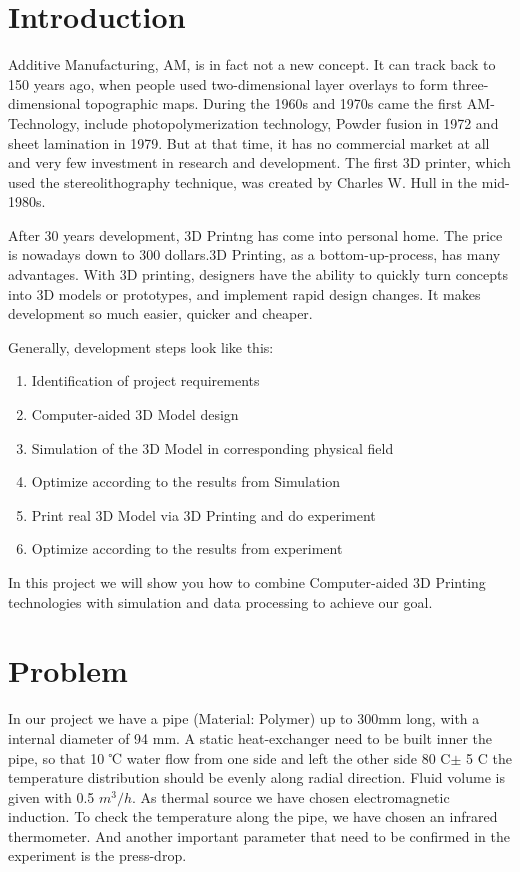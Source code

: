 \documentclass[journal,article,submit,moreauthors,pdftex]{Definitions/mdpi}
\begin{document}

\section{Introduction}

Additive Manufacturing, AM, is in fact not a new concept. It can track back to 150 years ago, when people used two-dimensional layer overlays to form three-dimensional topographic maps. During the 1960s and 1970s came the first AM-Technology, include photopolymerization technology, Powder fusion in 1972 and sheet lamination in 1979. But at that time, it has no commercial market at all and very few investment in research and development. \cite{link-1}
The first 3D printer, which used the stereolithography technique, was created by Charles W. Hull in the mid-1980s. \cite{link-2}

After 30 years development, 3D Printng has come into personal home. The price is nowadays down to 300 dollars.3D Printing, as a bottom-up-process, has many advantages. With 3D printing, designers have the ability to quickly turn concepts into 3D models or prototypes, and implement rapid design changes. It makes development so much easier, quicker and cheaper. 

Generally, development steps look like this: 
\begin{enumerate}
    \item Identification of project requirements
    \item Computer-aided 3D Model design
    \item Simulation of the 3D Model in corresponding physical field
    \item Optimize according to the results from Simulation
    \item Print real 3D Model via 3D Printing and do experiment
    \item Optimize according to the results from experiment
\end{enumerate}


In this project we will show you how to combine Computer-aided 3D Printing technologies with simulation and data processing to achieve our goal.
 
\section{Problem}
In our project we have a pipe (Material: Polymer) up to 300mm long, with a internal diameter of 94 mm. A static heat-exchanger need to be built inner the pipe, so that 10 ℃ water flow from one side and left the other side 80 \textdegree{}C$\pm$ 5 \textdegree{}C the temperature distribution should be evenly along radial direction. Fluid volume is given with 0.5 $m^3/h$. As thermal source we have chosen electromagnetic induction. To check the temperature along the pipe, we have chosen an infrared thermometer. And another important parameter that need to be confirmed in the experiment is the press-drop. 
\end{document}
